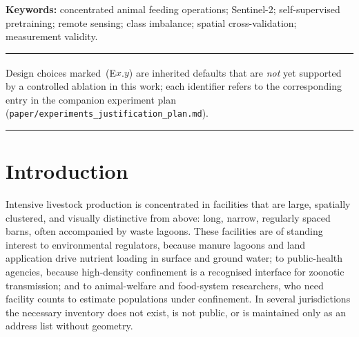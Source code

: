 \documentclass[11pt,a4paper]{article}
\newcommand{\code}[1]{\texttt{\small #1}}
\newcommand{\unablated}[1]{\textsuperscript{\dag}\,(#1)}
\begin{document}
\begin{abstract}
We also document, rather than omit, two data-integrity problems that materially
affected earlier results: a patch-store key misalignment that paired
approximately 34.6\% of labelled candidates with imagery from the wrong location,
and a systematic label-source shift between training and evaluation data. We
report corrected numbers, show that two previously published verdicts reverse
under clean data, and describe the invariants now enforced in code. Finally, we
argue that the dominant bottleneck in this problem is measurement rather than
modelling. Training the same configuration under five random seeds gives a
standard deviation of $0.033$ macro-F1 on the standard evaluation slice---a
decision band wider than nearly every intervention previously ranked on it---and
we show that roughly 80\% of that variance comes from a single class with six
held-out examples. Re-running twenty single-lever ablations against a purpose-built
blind benchmark, on which the same model is reproducible to $\sigma = 0.0008$,
we find that exactly one inherited default is worth changing, that a third of the
input channels contribute nothing measurable, and that two settings previously
believed to matter do not.
\end{abstract}

\noindent\textbf{Keywords:} concentrated animal feeding operations; Sentinel-2;
self-supervised pretraining; remote sensing; class imbalance; spatial
cross-validation; measurement validity.

\vspace{1em}
\noindent\rule{\linewidth}{0.4pt}
\noindent\footnotesize
Design choices marked \unablated{E$x$.$y$} are inherited defaults that are
\emph{not} yet supported by a controlled ablation in this work; each identifier
refers to the corresponding entry in the companion experiment plan
(\code{paper/experiments\_justification\_plan.md}).
\normalsize
\noindent\rule{\linewidth}{0.4pt}

\section{Introduction}

Intensive livestock production is concentrated in facilities that are large,
spatially clustered, and visually distinctive from above: long, narrow,
regularly spaced barns, often accompanied by waste lagoons. These facilities
are of standing interest to environmental regulators, because manure lagoons
and land application drive nutrient loading in surface and ground water; to
public-health agencies, because high-density confinement is a recognised
interface for zoonotic transmission; and to animal-welfare and food-system
researchers, who need facility counts to estimate populations under
confinement. In several jurisdictions the necessary inventory does not exist,
is not public, or is maintained only as an address list without geometry.
\end{document}
